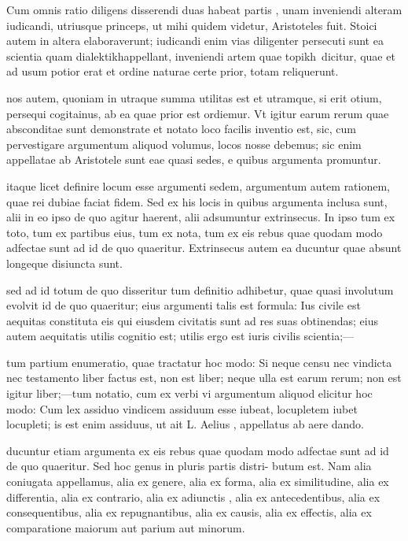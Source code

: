  Cum omnis ratio diligens disserendi duas habeat partis , unam inveniendi alteram iudicandi, utriusque princeps, ut mihi quidem videtur, Aristoteles fuit. Stoici autem in altera elaboraverunt; iudicandi enim vias diligenter persecuti sunt ea scientia quam dialektikh\n appellant, inveniendi artem quae topikh\ dicitur, quae et ad usum potior erat et ordine naturae certe prior, totam reliquerunt.

 nos autem, quoniam in utraque summa utilitas est et utramque, si erit otium, persequi cogitainus, ab ea quae prior est ordiemur. Vt igitur earum rerum quae absconditae sunt demonstrate et notato loco facilis inventio est, sic, cum pervestigare argumentum aliquod volumus, locos nosse debemus; sic enim appellatae ab Aristotele sunt eae quasi sedes, e quibus argumenta promuntur.

 itaque licet definire locum esse argumenti sedem, argumentum autem rationem, quae rei dubiae faciat fidem. Sed ex his locis in quibus argumenta inclusa sunt, alii in eo ipso de quo agitur haerent, alii adsumuntur extrinsecus. In ipso tum ex toto, tum ex partibus eius, tum ex nota, tum ex eis rebus quae quodam modo adfectae sunt ad id de quo quaeritur. Extrinsecus autem ea ducuntur quae absunt longeque disiuncta sunt.

 sed ad id totum de quo disseritur tum definitio adhibetur, quae quasi involutum evolvit id de quo quaeritur; eius argumenti talis est formula: Ius civile est aequitas constituta eis qui eiusdem civitatis sunt ad res suas obtinendas; eius autem aequitatis utilis cognitio est; utilis ergo est iuris civilis scientia;—

 tum partium enumeratio, quae tractatur hoc modo: Si neque censu nec vindicta nec testamento liber factus est, non est liber; neque ulla est earum rerum; non est igitur liber;—tum notatio, cum ex verbi vi argumentum aliquod elicitur hoc modo: Cum lex assiduo vindicem assiduum esse iubeat, locupletem iubet locupleti; is est enim assiduus, ut ait L. Aelius , appellatus ab aere dando.

 ducuntur etiam argumenta ex eis rebus quae quodam modo adfectae sunt ad id de quo quaeritur. Sed hoc genus in pluris partis distri- butum est. Nam alia coniugata appellamus, alia ex genere, alia ex forma, alia ex similitudine, alia ex differentia, alia ex contrario, alia ex adiunctis , alia ex antecedentibus, alia ex consequentibus, alia ex repugnantibus, alia ex causis, alia ex effectis, alia ex comparatione maiorum aut parium aut minorum.

